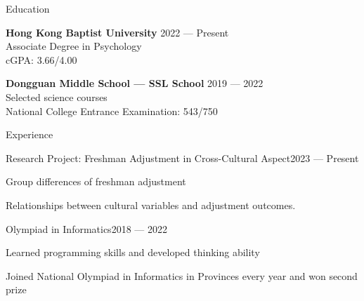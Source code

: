 \documentclass[
	11pt, %
]{resume} %
\begin{document}
\begin{rSection}{Education}

    \textbf{Hong Kong Baptist University} \hfill 2022 --- Present \\
    Associate Degree in Psychology \\
    cGPA: 3.66/4.00

    \textbf{Dongguan Middle School --- SSL School} \hfill 2019 --- 2022 \\
    Selected science courses \\
    National College Entrance Examination: 543/750

\end{rSection}


\begin{rSection}{Experience}

    \begin{rSubsection}{Research Project: Freshman Adjustment in Cross-Cultural Aspect}{2023 --- Present}{}{}
        \item Group differences of freshman adjustment
        \item Relationships between cultural variables and adjustment outcomes.
    \end{rSubsection}



    \begin{rSubsection}{Olympiad in Informatics}{2018 --- 2022}{}{}
        \item Learned programming skills and developed thinking ability
        \item Joined National Olympiad in Informatics in Provinces every year and won second prize
    \end{rSubsection}

\end{rSection}
\end{document}
